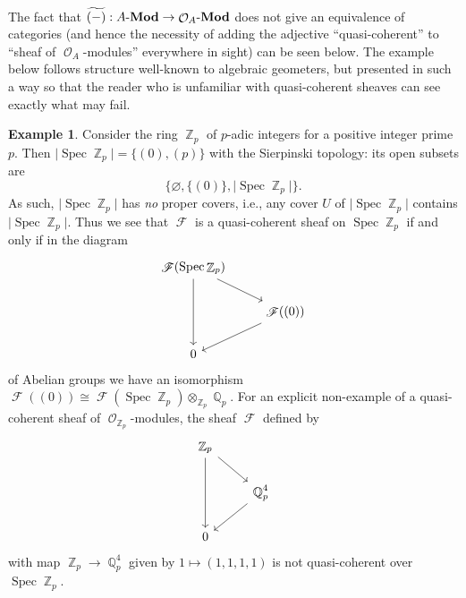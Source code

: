 \documentclass{amsart}
\theoremstyle{definition}
\newtheorem{example}[equation]{Example}
\newtheorem{remark}[equation]{Remark}
\DeclareMathOperator{\Fscr}{\mathscr{F}}
\DeclareMathOperator{\Qbb}{\mathbb{Q}}
\DeclareMathOperator{\Ocal}{\mathcal{O}}
\DeclareMathOperator{\mfrak}{\mathfrak{m}}
\DeclareMathOperator{\Z}{\mathbb{Z}}
\DeclareMathOperator{\Spec}{Spec}
\let\emptyset\varnothing
\let\emptyset\varnothing
\newcommand{\Mod}[1]{{#1}\textnormal{-}\mathbf{Mod}}
\numberwithin{equation}{subsection}
\begin{document}
The fact that $\widetilde{(-)}:\Mod{A} \to \Mod{\Ocal_A}$ does not give an equivalence of categories (and hence the necessity of adding the adjective ``quasi-coherent'' to ``sheaf of $\Ocal_A$-modules'' everywhere in sight) can be seen below. The example below follows structure well-known to algebraic geometers, but presented in such a way so that the reader who is unfamiliar with quasi-coherent sheaves can see exactly what may fail.
\begin{example}\label{Example: EZPZ QCoh}
Consider the ring $\Z_p$ of $p$-adic integers for a positive integer prime $p$. Then $\lvert \Spec \Z_p \rvert = \lbrace (0), (p)  \rbrace$ with the Sierpinski topology: its open subsets are 
\[
\lbrace \emptyset, \lbrace (0) \rbrace, \lvert \Spec \Z_p \rvert \rbrace.
\]
As such, $\lvert \Spec \Z_p \rvert$ has \emph{no} proper covers, i.e., any cover $U$ of $\lvert \Spec \Z_p \rvert$ contains $\lvert \Spec \Z_p \rvert$. Thus we see that $\Fscr$ is a quasi-coherent sheaf on $\Spec \Z_p$ if and only if in the diagram
\[
\begin{tikzcd}
	\Fscr(\Spec \Z_p) \ar[dr]{}{} \ar[dd] \\
	 & \Fscr((0)) \ar[dl] \\
	 0
\end{tikzcd}
\]
of Abelian groups we have an isomorphism $\Fscr((0)) \cong \Fscr(\Spec \Z_p) \otimes_{\Z_p} \Qbb_p$. For an explicit non-example of a quasi-coherent sheaf of $\Ocal_{\Z_p}$-modules, the sheaf $\Fscr$ defined by
\[
\begin{tikzcd}
\Z_p \ar[dr] \ar[dd] & \\
 & \Qbb_p^4 \ar[dl] \\
 0
\end{tikzcd}
\]
with map $\Z_p \to \Qbb_p^4$ given by $1 \mapsto (1,1,1,1)$ is not quasi-coherent over $\Spec \Z_p$.
\end{example}
\end{document}
